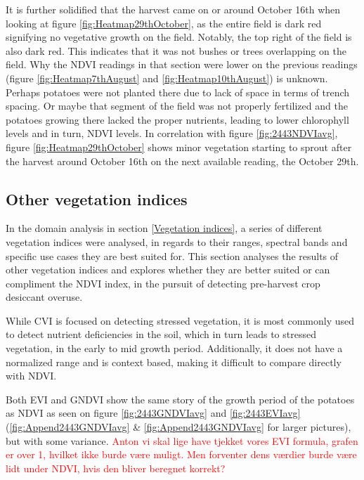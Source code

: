 It is further solidified that the harvest came on or around October 16th when looking at figure \ref{fig:Heatmap29thOctober}, as the entire field is dark red signifying no vegetative growth on the field. Notably, the top right of the field is also dark red. This indicates that it was not bushes or trees overlapping on the field. Why the NDVI readings in that section were lower on the previous readings (figure \ref{fig:Heatmap7thAugust} and \ref{fig:Heatmap10thAugust}) is unknown. Perhaps potatoes were not planted there due to lack of space in terms of trench spacing. Or maybe that segment of the field was not properly fertilized and the potatoes growing there lacked the proper nutrients, leading to lower chlorophyll levels and in turn, NDVI levels. In correlation with figure \ref{fig:2443NDVIavg}, figure \ref{fig:Heatmap29thOctober} shows minor vegetation starting to sprout after the harvest around October 16th on the next available reading, the October 29th.

\subsection{Other vegetation indices}
In the domain analysis in section \ref{Vegetation indices}, a series of different vegetation indices were analysed, in regards to their ranges, spectral bands and specific use cases they are best suited for. This section analyses the results of other vegetation indices and explores whether they are better suited or can compliment the NDVI index, in the pursuit of detecting pre-harvest crop desiccant overuse.

While CVI is focused on detecting stressed vegetation, it is most commonly used to detect nutrient deficiencies in the soil, which in turn leads to stressed vegetation, in the early to mid growth period. Additionally, it does not have a normalized range and is context based, making it difficult to compare directly with NDVI.

Both EVI and GNDVI show the same story of the growth period of the potatoes as NDVI as seen on figure \ref{fig:2443GNDVIavg} and \ref{fig:2443EVIavg} (\ref{fig:Append2443GNDVIavg} \& \ref{fig:Append2443GNDVIavg} for larger pictures), but with some variance. \textcolor{red}{Anton vi skal lige have tjekket vores EVI formula, grafen er over 1, hvilket ikke burde være muligt. Men forventer dens værdier burde være lidt under NDVI, hvis den bliver beregnet korrekt?}

